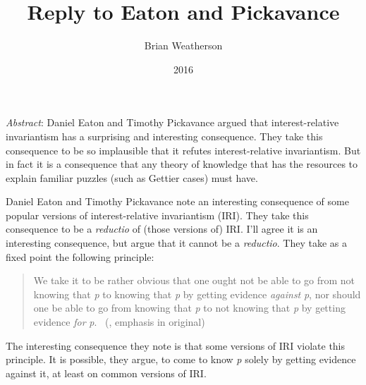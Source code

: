 \documentclass[
  11pt,
  letterpaper,
  DIV=11,
  numbers=noendperiod,
  twoside]{scrartcl}
\title{Reply to Eaton and Pickavance}
\author{Brian Weatherson}
\date{2016}
\renewenvironment{abstract}
 {\vspace{-1.25cm}
 \quotation\small\noindent\emph{Abstract}:}
 {\endquotation}
\begin{document}
\maketitle
\begin{abstract}
Daniel Eaton and Timothy Pickavance argued that interest-relative
invariantism has a surprising and interesting consequence. They take
this consequence to be so implausible that it refutes interest-relative
invariantism. But in fact it is a consequence that any theory of
knowledge that has the resources to explain familiar puzzles (such as
Gettier cases) must have.
\end{abstract}


Daniel Eaton and Timothy Pickavance note an interesting consequence of
some popular versions of interest-relative invariantism (IRI). They take
this consequence to be a \emph{reductio} of (those versions of) IRI.
I'll agree it is an interesting consequence, but argue that it cannot be
a \emph{reductio}. They take as a fixed point the following principle:

\begin{quote}
We take it to be rather obvious that one ought not be able to go from
not knowing that \emph{p} to knowing that \emph{p} by getting evidence
\emph{against} \emph{p}, nor should one be able to go from knowing that
\emph{p} to not knowing that \emph{p} by getting evidence \emph{for}
\emph{p}. ~(, emphasis in original)
\end{quote}

The interesting consequence they note is that some versions of IRI
violate this principle. It is possible, they argue, to come to know
\emph{p} solely by getting evidence against it, at least on common
versions of IRI.
\end{document}

